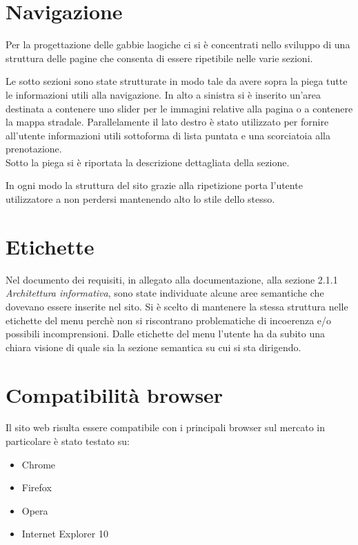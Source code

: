 \documentclass[a4paper,12pt,hidelinks]{report}
\begin{document}
\newpage
\section*{Navigazione}
Per la progettazione delle gabbie laogiche ci si è concentrati nello sviluppo di una struttura delle pagine che consenta di essere ripetibile nelle varie sezioni.
\par Le sotto sezioni sono state strutturate in modo tale da avere sopra la piega tutte le informazioni utili alla navigazione. In alto a sinistra si è inserito un'area 
destinata a contenere uno slider per le immagini relative alla pagina o a contenere la mappa stradale. Parallelamente il lato destro è stato utilizzato per 
fornire all'utente informazioni utili sottoforma di lista puntata e una scorciatoia alla prenotazione.
\\Sotto la piega si è riportata la descrizione dettagliata della sezione.
 \par In ogni modo la struttura del sito grazie alla ripetizione porta l'utente utilizzatore a non perdersi mantenendo alto lo stile dello stesso.

\section*{Etichette}
Nel documento dei requisiti, in allegato alla documentazione, alla sezione 2.1.1 \textit{Architettura informativa}, sono state individuate alcune aree semantiche 
che dovevano essere inserite nel sito. Si è scelto di mantenere la stessa struttura nelle etichette del menu perchè non si riscontrano problematiche di 
incoerenza e/o possibili incomprensioni. 
Dalle etichette del menu l'utente ha da subito una chiara visione di quale sia la sezione semantica su cui si sta dirigendo. 

\section*{Compatibilità browser}
Il sito web risulta essere compatibile con i principali browser sul mercato in particolare è stato testato su:
\begin{itemize}
 \item Chrome
 \item Firefox
 \item Opera
 \item Internet Explorer 10
\end{itemize}
\end{document}
